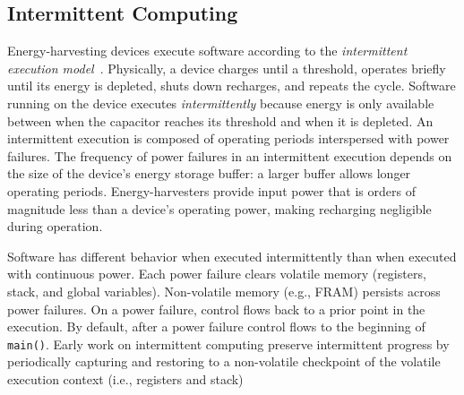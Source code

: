 \subsection{Intermittent Computing}
\label{sec:background_consistency}
Energy-harvesting devices execute software according to the {\em intermittent
execution model}~\cite{dino,chain,alpaca,ratchet}.  Physically, a device
charges until a threshold, operates briefly until its energy is depleted, shuts
down recharges, and repeats the cycle.  Software running on the device executes
{\em intermittently} because energy is only available between when the
capacitor reaches its threshold and when it is depleted. An intermittent
execution is composed of operating periods interspersed with power failures.
The frequency of power failures in an intermittent execution depends on the
size of the device's energy storage buffer: a larger buffer allows longer
operating periods.  Energy-harvesters provide input power that is orders of
magnitude less than a device's operating power, making recharging negligible
during operation.

Software has different behavior when executed intermittently than when executed
with continuous power.  Each power failure clears volatile memory (registers,
stack, and global variables). Non-volatile memory (e.g., FRAM) persists across
power failures. On a power failure, control flows back to a prior point in the
execution. By default, after a power failure control flows to the beginning of
{\tt main()}. Early work on intermittent computing preserve intermittent
progress by periodically capturing and restoring to a non-volatile checkpoint
of the volatile execution context (i.e., registers and
stack)~\cite{mementos,hibernusplusplus,quickrecall,idetic}

